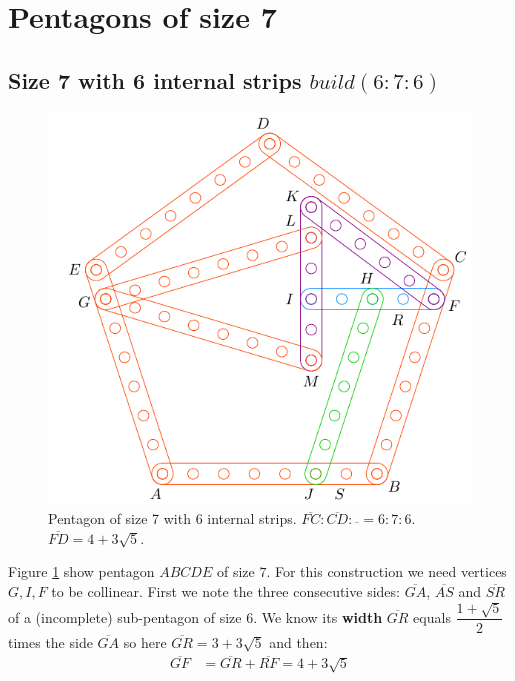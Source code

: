 \documentclass[11pt]{article}
\begin{document}

\section{Pentagons of size 7}

\subsection{Size 7 with 6 internal strips $build(6:7:6)$}

\begin{figure}[H]
\centering
\includegraphics[scale=1]{7/penta7-6a}
\caption{Pentagon of size 7 with 6 internal strips. $\overline{FC} : \overline{CD} : \overline{} = 6:7:6$. $\overline{FD} = 4 + 3\sqrt5$.}
\label{fig:penta7-6a}
\end{figure}

Figure \ref{fig:penta7-6a} show pentagon $ABCDE$ of size $7$. For this construction we need vertices $G,I,F$ to be collinear. First we note the three consecutive sides: $\overline{GA}$, $\overline{AS}$ and $\overline{SR}$ of a (incomplete) sub-pentagon of size $6$. We know its \textbf{width} $\overline{GR}$ equals $\dfrac{1+\sqrt5}2$ times the side $\overline{GA}$ so here $\overline{GR} = 3 + 3\sqrt5$ and then:
\begin{align}
\overline{GF} &= \overline{GR} + \overline{RF} = 4 + 3\sqrt5
\end{align}
\end{document}
